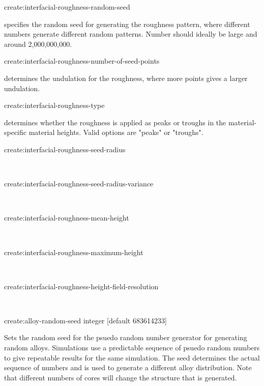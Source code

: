 {\zicf create:interfacial-roughness-random-seed} specifies the random seed for generating the roughness pattern, where different numbers generate different random patterns. Number should ideally be large and around 2,000,000,000.\\ \par

{\zicf create:interfacial-roughness-number-of-seed-points} determines the undulation for the roughness, where more points gives a larger undulation.\\ \par

{\zicf create:interfacial-roughness-type} determines whether the roughness is applied as peaks or troughs in the material-specific material heights. Valid options are "peaks" or "troughs".\\ \par

{\zicf create:interfacial-roughness-seed-radius}\\ \par

{\zicf create:interfacial-roughness-seed-radius-variance}\\ \par

{\zicf create:interfacial-roughness-mean-height}\\ \par

{\zicf create:interfacial-roughness-maximum-height}\\ \par

{\zicf create:interfacial-roughness-height-field-resolution}\\ \par

{\zicf create:alloy-random-seed integer [default 683614233]}
Sets the random seed for the psuedo random number generator for generating random
alloys. Simulations use a predictable sequence of psuedo random numbers to give
repeatable results for the same simulation. The seed determines the actual
sequence of numbers and is used to generate a different alloy distribution.
Note that different numbers of cores will change the structure that is generated.\\

